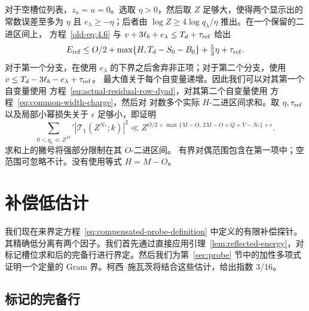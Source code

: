 \documentclass[11pt,a4paper]{article}
\numberwithin{equation}{section}
\numberwithin{figure}{section}
\theoremstyle{definition}
\theoremstyle{remark}
\begin{document}
对于空槽位列表，\(z_a=u=0\)。选取 \(\eta>0\)，然后取 \(Z\)
足够大，使得两个显示出的常数误差至多为 \(\eta\) 且
\(e_\lambda\ge-\eta\)；后者由
\(\log Z\ge4\log q_\lambda/\eta\) 推出。在一个保留的二进区间上，
方程~\eqref{old-eq:4.6} 与
\(v+3\ell_b+e_\lambda\le T_d+\tau_{\rm ref}\) 给出
\[
 E_{\rm ref}
 \le O/2+\max\{H,T_d-S_0-B_0\}+\tfrac53\eta+\tau_{\rm ref}.
\]
对于第一个分支，在使用 \(e_\lambda\) 的下界之后舍弃非正项；对于第二个分支，使用
\(v\le T_d-3\ell_b-e_\lambda+\tau_{\rm ref}\)。
最大值关于每个自变量递增。因此我们可以对其第一个自变量使用
方程~\eqref{eq:actual-residual-row-dyad}，对其第二个自变量使用
方程~\eqref{eq:common-width-charge}，然后对
对数多个实际 \(H\)-二进区间求和。取 \(\eta,\tau_{\rm ref}\)
以及局部小幂损失关于
\(\epsilon\) 足够小，即证明
\begin{equation}\label{eq:completed-moment}
 \sum_{0<q_k\ll Z^M}'|\mathcal T_1(Z^{N_*};k)|^2
 \ll Z^{O/2+\max\{M-O,\,2M-O+Q+V-N_*\}+\epsilon}.
\end{equation}
求和上的撇号将强部分限制在其 \(O\)-二进区间。
有界对偶范围包含在第一项中；空范围可忽略不计。没有使用等式 \(H=M-O\)。

\section{补偿低估计}\label{sec:compensated-low}我们现在来界定方程~\eqref{eq:compensated-probe-definition} 中定义的有限补偿探针。其精确低分离有两个因子。我们首先通过直接应用引理~\ref{lem:reflected-energy}，对标记槽位求和后的完备行进行界定。然后我们为第~\ref{sec:probe} 节中的加性多项式证明一个定量的 Gram 界。柯西--施瓦茨将结合这些估计，给出指数 $3/16$。

\subsection{标记的完备行}
\end{document}

